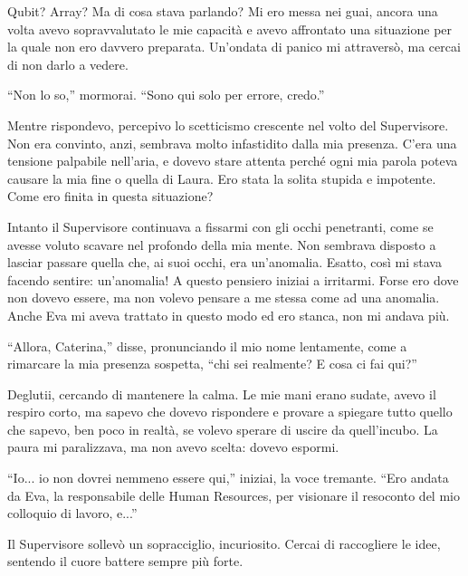 Qubit? Array? Ma di cosa stava parlando? Mi ero messa nei guai, ancora una volta avevo sopravvalutato le mie capacità e avevo affrontato una situazione per la quale non ero davvero preparata.
Un'ondata di panico mi attraversò, ma cercai di non darlo a vedere.

\begin{dialogue}
 \enquote{Non lo so,} mormorai. \enquote{Sono qui solo per errore, credo.}
\end{dialogue}

Mentre rispondevo, percepivo lo scetticismo crescente nel volto del Supervisore. Non era convinto, anzi, sembrava molto infastidito dalla mia presenza. C'era una tensione palpabile nell'aria, e dovevo stare attenta perché ogni mia parola poteva  causare la mia fine o quella di Laura. Ero stata la solita stupida e impotente. Come ero finita in questa situazione?

Intanto il Supervisore continuava a fissarmi con gli occhi penetranti, come se avesse voluto scavare nel profondo della mia mente. Non sembrava disposto a lasciar passare quella che, ai suoi occhi, era un'anomalia. Esatto, così mi stava facendo sentire: un'anomalia! A questo pensiero iniziai a irritarmi. Forse ero dove non dovevo essere, ma non volevo pensare a me stessa come ad una anomalia. Anche Eva mi aveva trattato in questo modo ed ero stanca, non mi andava più.

\begin{dialogue}
 \enquote{Allora, Caterina,} disse, pronunciando il mio nome lentamente, come a rimarcare la mia presenza sospetta, \enquote{chi sei realmente? E cosa ci fai qui?}
\end{dialogue}

Deglutii, cercando di mantenere la calma. Le mie mani erano sudate, avevo il respiro corto, ma sapevo che dovevo rispondere e provare a spiegare tutto quello che sapevo, ben poco in realtà, se volevo sperare di uscire da quell'incubo. La paura mi paralizzava, ma non avevo scelta: dovevo espormi.

\begin{dialogue}
 \enquote{Io... io non dovrei nemmeno essere qui,} iniziai, la voce tremante. \enquote{Ero andata da Eva, la responsabile delle Human Resources, per visionare il resoconto del mio colloquio di lavoro, e...}
\end{dialogue}

Il Supervisore sollevò un sopracciglio, incuriosito. Cercai di raccogliere le idee, sentendo il cuore battere sempre più forte.

